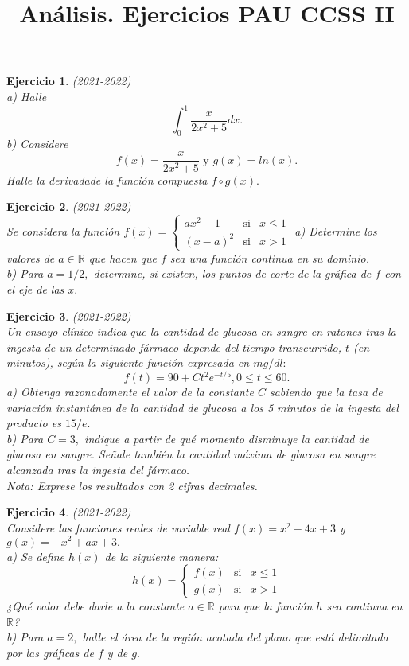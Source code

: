 \documentclass[12pt, a4paper]{amsart}
\newtheorem{ejer}{Ejercicio}
\begin{document}
\thispagestyle{plain}

\title{Análisis. Ejercicios PAU CCSS II}

\date{}

\maketitle


\begin{ejer}\em (2021-2022)\\
a) Halle
\[\int_0^1 \frac{x}{2x^2+5}dx.\]
b) Considere
\[f(x)=\frac{x}{2x^2+5} \text{ y } g(x) = ln(x).\]
Halle la derivadade la función compuesta $f\circ g(x).$
\end{ejer}

\begin{ejer}\em (2021-2022)\\
Se considera la función $f(x)=\left \{ \begin{matrix}
ax^2 -1  & \text{si} & x \leq 1\\
(x-a)^2 & \text{si} & x> 1
\end{matrix}\right.
$
a) Determine los valores de $a\in\mathbb{R}$ que hacen que $f$ sea una función continua en su dominio.\\
b) Para $a = 1/2,$ determine, si existen, los puntos de corte de la gráfica de $f$ con el eje de las $x.$
\end{ejer}

\begin{ejer}\em (2021-2022)\\
Un ensayo clínico indica que la cantidad de glucosa en sangre en ratones tras la ingesta de un determinado fármaco depende del tiempo transcurrido, $t$ (en minutos), según la siguiente función
expresada en $mg/dl:$
\[f(t) = 90 + Ct^2e^{-t/5}, 0 \leq t \leq 60.\]
a) Obtenga razonadamente el valor de la constante $C$ sabiendo que la tasa de variación instantánea de la cantidad de glucosa a los 5 minutos de la ingesta del producto es $15/e.$\\
b) Para $C = 3,$ indique a partir de qué momento disminuye la cantidad de glucosa en sangre. Señale también la cantidad máxima de glucosa en sangre alcanzada tras la ingesta del fármaco.\\
Nota: Exprese los resultados con 2 cifras decimales.
\end{ejer}

\begin{ejer}\em (2021-2022)\\
Considere las funciones reales de variable real $f(x) = x^2 - 4x + 3$ y $g(x) = -x^2 + ax + 3.$\\
a) Se define $h(x)$ de la siguiente manera:
\[h(x)=\left \{ \begin{matrix}
f(x)  & \text{si} & x \leq 1\\
g(x) & \text{si} & x> 1
\end{matrix}\right.\]
¿Qué valor debe darle a la constante $a\in\mathbb{R}$ para que la función $h$ sea continua en $\mathbb{R}$?\\
b) Para $a = 2,$ halle el área de la región acotada del plano que está delimitada por las gráficas de $f$ y de $g.$
\end{ejer}
\end{document}
